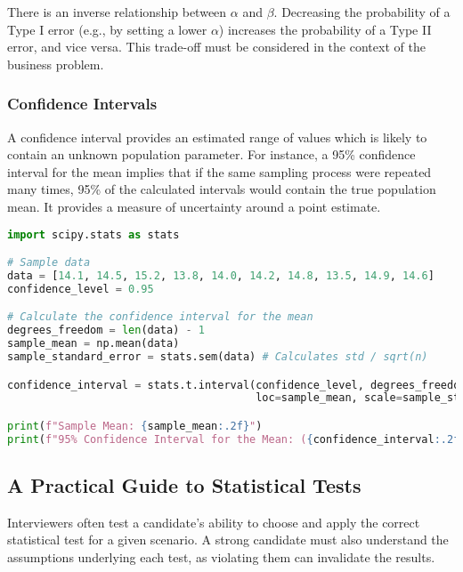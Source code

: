 \documentclass[11pt,a4paper]{article}
\begin{document}
There is an inverse relationship between $\alpha$ and $\beta$. Decreasing the probability of a Type I error (e.g., by setting a lower $\alpha$) increases the probability of a Type II error, and vice versa. This trade-off must be considered in the context of the business problem.

\subsubsection{Confidence Intervals}

A confidence interval provides an estimated range of values which is likely to contain an unknown population parameter. For instance, a 95\% confidence interval for the mean implies that if the same sampling process were repeated many times, 95\% of the calculated intervals would contain the true population mean. It provides a measure of uncertainty around a point estimate.

\begin{lstlisting}[language=Python, caption=Calculating a Confidence Interval]
import scipy.stats as stats

# Sample data
data = [14.1, 14.5, 15.2, 13.8, 14.0, 14.2, 14.8, 13.5, 14.9, 14.6]
confidence_level = 0.95

# Calculate the confidence interval for the mean
degrees_freedom = len(data) - 1
sample_mean = np.mean(data)
sample_standard_error = stats.sem(data) # Calculates std / sqrt(n)

confidence_interval = stats.t.interval(confidence_level, degrees_freedom,
                                       loc=sample_mean, scale=sample_standard_error)

print(f"Sample Mean: {sample_mean:.2f}")
print(f"95% Confidence Interval for the Mean: ({confidence_interval:.2f}, {confidence_interval[1]:.2f})")
\end{lstlisting}

\subsection{A Practical Guide to Statistical Tests}

Interviewers often test a candidate's ability to choose and apply the correct statistical test for a given scenario. A strong candidate must also understand the assumptions underlying each test, as violating them can invalidate the results.
\end{document}
